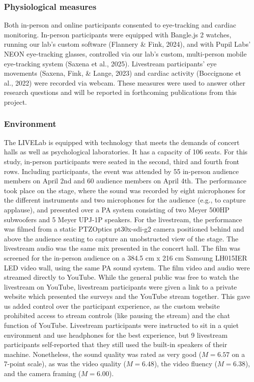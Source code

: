 \documentclass[
  man,floatsintext]{apa6}
\begin{document}
\subsubsection{Physiological measures}\label{physiological-measures}

Both in-person and online participants consented to eye-tracking and cardiac monitoring. In-person participants were equipped with Bangle.js 2 watches, running our lab's custom software (Flannery \& Fink, 2024), and with Pupil Labs' NEON eye-tracking glasses, controlled via our lab's custom, multi-person mobile eye-tracking system (Saxena et al., 2025). Livestream participants' eye movements (Saxena, Fink, \& Lange, 2023) and cardiac activity (Boccignone et al., 2022) were recorded via webcam. These measures were used to answer other research questions and will be reported in forthcoming publications from this project.

\subsubsection{Environment}\label{environment}

The LIVELab is equipped with technology that meets the demands of concert halls as well as psychological laboratories. It has a capacity of 106 seats. For this study, in-person participants were seated in the second, third and fourth front rows. Including participants, the event was attended by 55 in-person audience members on April 2nd and 60 audience members on April 4th. The performance took place on the stage, where the sound was recorded by eight microphones for the different instruments and two microphones for the audience (e.g., to capture applause), and presented over a PA system consisting of two Meyer 500HP subwoofers and 5 Meyer UPJ-1P speakers. For the livestream, the performance was filmed from a static PTZOptics pt30x-sdi-g2 camera positioned behind and above the audience seating to capture an unobstructed view of the stage. The livestream audio was the same mix presented in the concert hall. The film was screened for the in-person audience on a 384.5 cm x 216 cm Samsung LH015IER LED video wall, using the same PA sound system. The film video and audio were streamed directly to YouTube. While the general public was free to watch the livestream on YouTube, livestream participants were given a link to a private website which presented the surveys and the YouTube stream together. This gave us added control over the participant experience, as the custom website prohibited access to stream controls (like pausing the stream) and the chat function of YouTube. Livestream participants were instructed to sit in a quiet environment and use headphones for the best experience, but 9 livestream participants self-reported that they still used the built-in speakers of their machine. Nonetheless, the sound quality was rated as very good (\(M = 6.57\) on a 7-point scale), as was the video quality (\(M = 6.48\)), the video fluency (\(M = 6.38\)), and the camera framing (\(M = 6.00\)).
\end{document}
